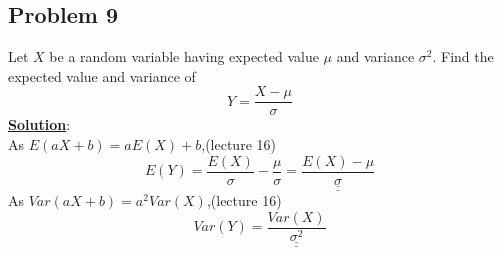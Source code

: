 \documentclass[11pt,letter paper]{report}
\begin{document}
\subsection*{Problem 9}
Let $X$ be a random variable having expected value $\mu$ and variance $\sigma^2$. Find the expected value and variance of $$Y=\frac{X-\mu}{\sigma}$$
{\bf \underline{Solution}}:\\
As $E(aX+b)=aE(X)+b$,(lecture 16)
$$E(Y)=\frac{E(X)}{\sigma}-\frac{\mu}{\sigma}=\underline{\underline{\frac{E(X)-\mu}{\sigma}}}$$
As $Var(aX+b)=a^2Var(X)$,(lecture 16) 
$$Var(Y)=\underline{\underline{\frac{Var(X)}{\sigma^2}}}$$
\end{document}

